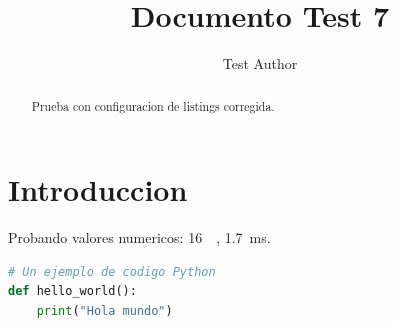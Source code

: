 \documentclass[conference,a4paper]{IEEEtran}
\begin{document}
\title{Documento Test 7}
\author{Test Author}
\maketitle

\begin{abstract}
Prueba con configuracion de listings corregida.
\end{abstract}

\section{Introduccion}
Probando valores numericos: \SI{16}{\giga\byte}, \SI{1.7}{\milli\second}.

\begin{lstlisting}[language=Python]
# Un ejemplo de codigo Python
def hello_world():
    print("Hola mundo")
\end{lstlisting}
\end{document}
